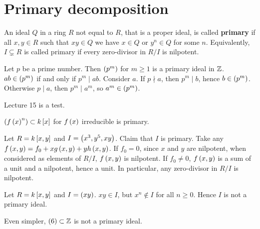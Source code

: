 \pagebreak

\section{Primary decomposition}

\begin{definition}
An ideal $ Q $ in a ring $ R $ not equal to $ R $, that is a proper ideal, is called \textbf{primary} if all $ x, y \in R $ such that $ xy \in Q $ we have $ x \in Q $ or $ y^n \in Q $ for some $ n $. Equivalently, $ I \subsetneq R $ is called primary if every zero-divisor in $ R / I $ is nilpotent.
\end{definition}

\begin{example*}
Let $ p $ be a prime number. Then $ \rb{p^m} $ for $ m \ge 1 $ is a primary ideal in $ \Z $. $ ab \in \rb{p^m} $ if and only if $ p^m \mid ab $. Consider $ a $. If $ p \nmid a $, then $ p^m \mid b $, hence $ b \in \rb{p^m} $. Otherwise $ p \mid a $, then $ p^m \mid a^m $, so $ a^m \in \rb{p^m} $.
\end{example*}


Lecture 15 is a test.


\begin{example*}
$ \rb{f\rb{x}^n} \subset k\sb{x} $ for $ f\rb{x} $ irreducible is primary.
\end{example*}

\begin{example*}
Let $ R = k\sb{x, y} $ and $ I = \rb{x^3, y^5, xy} $. Claim that $ I $ is primary. Take any $ f\rb{x, y} = f_0 + xg\rb{x, y} + yh\rb{x, y} $. If $ f_0 = 0 $, since $ x $ and $ y $ are nilpotent, when considered as elements of $ R / I $, $ f\rb{x, y} $ is nilpotent. If $ f_0 \ne 0 $, $ f\rb{x, y} $ is a sum of a unit and a nilpotent, hence a unit. In particular, any zero-divisor in $ R / I $ is nilpotent.
\end{example*}

\begin{example*}
Let $ R = k\sb{x, y} $ and $ I = \rb{xy} $. $ xy \in I $, but $ x^n \notin I $ for all $ n \ge 0 $. Hence $ I $ is not a primary ideal.
\end{example*}

\begin{example*}
Even simpler, $ \rb{6} \subset \Z $ is not a primary ideal.
\end{example*}

